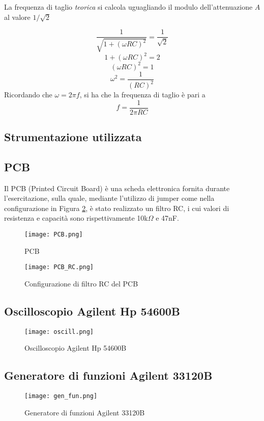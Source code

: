 La frequenza di taglio \emph{teorica} si calcola uguagliando il modulo dell'attenuazione $A$ al valore $1/\sqrt{2}$

\[\frac{1}{\sqrt{1+(\omega RC)^2}} = \frac{1}{\sqrt{2}}\]
\[1+(\omega RC)^2 = 2\] 
\[(\omega RC)^2 = 1\]
\[\omega ^2 = \frac{1}{(RC)^2}\]
Ricordando che $\omega = 2\pi f$, si ha che la frequenza di taglio è pari a 
\[f=\frac{1}{2\pi RC}\]

\subsection{Strumentazione utilizzata}
\subsection*{PCB}
Il PCB (Printed Circuit Board) è una scheda elettronica fornita durante l'esercitazione, sulla quale, mediante l'utilizzo di jumper come nella configurazione in Figura \ref{fig:pcb_rc}, è stato realizzato un filtro RC, i cui valori di resistenza e capacità sono rispettivamente 10k$\Omega$ e 47nF.

\begin{figure}[h]
    \centering
    \texttt{[image: PCB.png]} 
    \caption{PCB}
    \label{fig:pcb}
\end{figure}

\begin{figure}[h]
    \centering
    \texttt{[image: PCB\_RC.png]}
    \caption{Configurazione di filtro RC del PCB}
    \label{fig:pcb_rc}
\end{figure}
\FloatBarrier

\clearpage
\subsection*{Oscilloscopio Agilent Hp 54600B}
\begin{figure}[h]
    \centering
    \texttt{[image: oscill.png]}
    \caption{Oscilloscopio Agilent Hp 54600B}
    \label{fig:oscill}
\end{figure}
\FloatBarrier

\subsection*{Generatore di funzioni Agilent 33120B}
\begin{figure}[h]
    \centering
    \texttt{[image: gen\_fun.png]}
    \caption{Generatore di funzioni Agilent 33120B}
    \label{fig:gen_fun}
\end{figure}
\FloatBarrier

